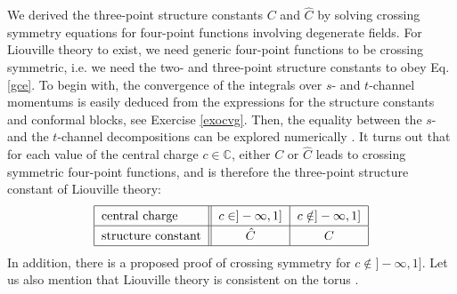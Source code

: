 \documentclass[12pt, a4paper, notitlepage, twoside]{report}
\numberwithin{equation}{section}
\theoremstyle{break}
\begin{document}
We derived the three-point structure constants $C$ and $\hat C$ by solving crossing symmetry equations for four-point functions involving degenerate fields. 
For Liouville theory to exist, we need generic four-point functions to be crossing symmetric, i.e. we need the two- and three-point structure constants to obey Eq. \eqref{gce}.
To begin with, the convergence of the integrals over $s$- and $t$-channel momentums is easily deduced from the expressions for the structure constants and conformal blocks, see Exercise \ref{exocvg}.
Then, the equality between the $s$- and the $t$-channel decompositions can be explored numerically \cite{rs15}. 
It turns out that for each value of the central charge $c\in\mathbb{C}$, either $C$ or $\hat C$ leads to crossing symmetric four-point functions, and is therefore the three-point structure constant of Liouville theory:
\begin{align}
\renewcommand{\arraystretch}{1.3}
 \begin{tabular}{|l||c|c|}
  \hline
  central charge &  $c\in ]-\infty, 1]$ & $c\notin ]-\infty, 1]$
  \\
  \hline
  structure constant & $\hat C$  & $C$ 
  \\
  \hline
 \end{tabular}
 \label{ccr}
\end{align}
In addition, there is a proposed proof \cite{tes03b} of crossing symmetry for $c\notin ]-\infty, 1]$.
Let us also mention that Liouville theory is consistent on the torus \cite{hjs09, rs15}. 
\end{document}
